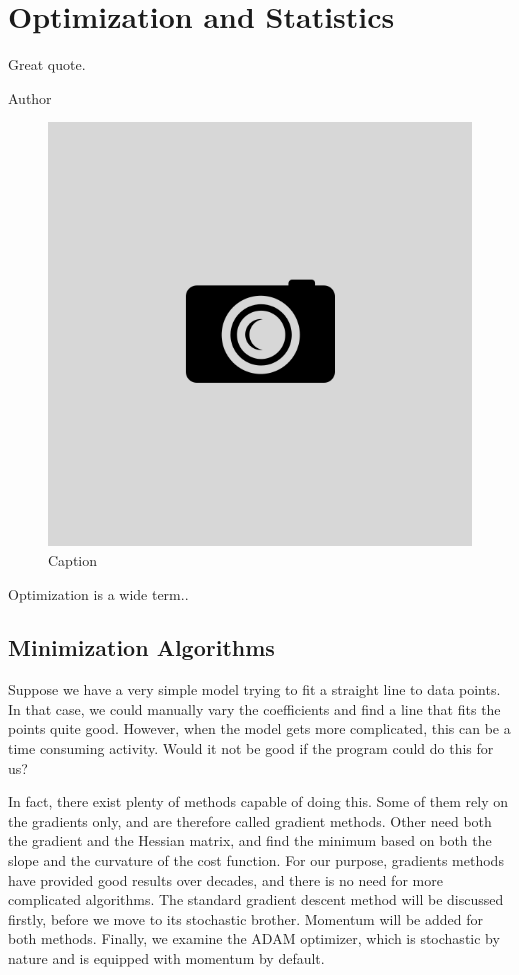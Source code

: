 \chapter{Optimization and Statistics} \label{chp:optimization}
\epigraph{Great quote.}{Author}
\begin{figure}[H]
	\centering
	\includegraphics[scale=0.4]{Images/example.png}
	\caption{Caption}
\end{figure}

Optimization is a wide term..

\newpage
\section{Minimization Algorithms}
Suppose we have a very simple model trying to fit a straight line to data points. In that case, we could manually vary the coefficients and find a line that fits the points quite good. However, when the model gets more complicated, this can be a time consuming activity. Would it not be good if the program could do this for us?

In fact, there exist plenty of methods capable of doing this. Some of them rely on the gradients only, and are therefore called gradient methods. Other need both the gradient and the Hessian matrix, and find the minimum based on both the slope and the curvature of the cost function. For our purpose, gradients methods have provided good results over decades, and there is no need for more complicated algorithms. The standard gradient descent method will be discussed firstly, before we move to its stochastic brother. Momentum will be added for both methods. Finally, we examine the ADAM optimizer, which is stochastic by nature and is equipped with momentum by default. 

